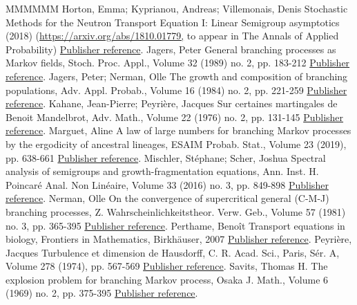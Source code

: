 \documentclass[11pt]{article}
\theoremstyle{definition}
\numberwithin{equation}{section}
\numberwithin{figure}{section}
\numberwithin{table}{section}
\begin{document}
\begin{thebibliography}{MMMMMM}
 Horton, Emma; Kyprianou, Andreas; Villemonais, Denis Stochastic Methods for the Neutron Transport Equation I: Linear Semigroup asymptotics (2018) (\url{https://arxiv.org/abs/1810.01779,} to appear in The Annals of Applied Probability) \href{https://ahl.centre-mersenne.org/item/AHL_2020__3__795_0/#HKV}{Publisher reference}.
 Jagers, Peter General branching processes as Markov fields, Stoch. Proc. Appl., Volume 32 (1989) no. 2, pp. 183-212 \href{https://ahl.centre-mersenne.org/item/AHL_2020__3__795_0/#Jagers}{Publisher reference}.
 Jagers, Peter; Nerman, Olle The growth and composition of branching populations, Adv. Appl. Probab., Volume 16 (1984) no. 2, pp. 221-259 \href{https://ahl.centre-mersenne.org/item/AHL_2020__3__795_0/#JN84}{Publisher reference}.
 Kahane, Jean-Pierre; Peyrière, Jacques Sur certaines martingales de Benoit Mandelbrot, Adv. Math., Volume 22 (1976) no. 2, pp. 131-145 \href{https://ahl.centre-mersenne.org/item/AHL_2020__3__795_0/#KaP}{Publisher reference}.
 Marguet, Aline A law of large numbers for branching Markov processes by the ergodicity of ancestral lineages, ESAIM Probab. Stat., Volume 23 (2019), pp. 638-661 \href{https://ahl.centre-mersenne.org/item/AHL_2020__3__795_0/#Mar-lln}{Publisher reference}.
 Mischler, Stéphane; Scher, Joshua Spectral analysis of semigroups and growth-fragmentation equations, Ann. Inst. H. Poincaré Anal. Non Linéaire, Volume 33 (2016) no. 3, pp. 849-898 \href{https://ahl.centre-mersenne.org/item/AHL_2020__3__795_0/#MS16}{Publisher reference}.
 Nerman, Olle On the convergence of supercritical general (C-M-J) branching processes, Z. Wahrscheinlichkeitstheor. Verw. Geb., Volume 57 (1981) no. 3, pp. 365-395 \href{https://ahl.centre-mersenne.org/item/AHL_2020__3__795_0/#Nerman}{Publisher reference}.
 Perthame, Benoît Transport equations in biology, Frontiers in Mathematics, Birkhäuser, 2007 \href{https://ahl.centre-mersenne.org/item/AHL_2020__3__795_0/#Per07}{Publisher reference}.
 Peyrière, Jacques Turbulence et dimension de Hausdorff, C. R. Acad. Sci., Paris, Sér. A, Volume 278 (1974), pp. 567-569 \href{https://ahl.centre-mersenne.org/item/AHL_2020__3__795_0/#Pey}{Publisher reference}.
 Savits, Thomas H. The explosion problem for branching Markov process, Osaka J. Math., Volume 6 (1969) no. 2, pp. 375-395 \href{https://ahl.centre-mersenne.org/item/AHL_2020__3__795_0/#Savits}{Publisher reference}.

\end{thebibliography}
\end{document}
